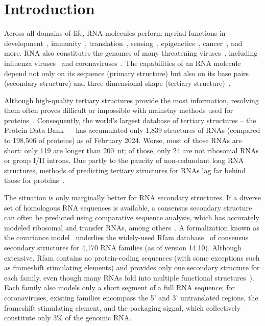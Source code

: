 \documentclass[main.tex]{subfiles}
\begin{document}
\section{Introduction}

Across all domains of life, RNA molecules perform myriad functions in development~\cite{Klattenhoff2013}, immunity~\cite{Wiedenheft2012}, translation~\cite{Noller2012}, sensing~\cite{Kortmann2012,Serganov2013}, epigenetics~\cite{Bhan2015}, cancer~\cite{Hajjari2015}, and more.
RNA also constitutes the genomes of many threatening viruses~\cite{Woolhouse2018}, including influenza viruses~\cite{Bouvier2008} and coronaviruses~\cite{Yang2015a}.
The capabilities of an RNA molecule depend not only on its sequence (primary structure) but also on its base pairs (secondary structure) and three-dimensional shape (tertiary structure)~\cite{Mortimer2014}.

Although high-quality tertiary structures provide the most information, resolving them often proves difficult or impossible with mainstay methods used for proteins~\cite{Kappel2020}.
Consequently, the world's largest database of tertiary structures -- the Protein Data Bank~\cite{Berman2000} -- has accumulated only 1,839 structures of RNAs (compared to 198,506 of proteins) as of February 2024.
Worse, most of those RNAs are short: only 119 are longer than 200~nt; of those, only 24 are not ribosomal RNAs or group I/II introns.
Due partly to the paucity of non-redundant long RNA structures, methods of predicting tertiary structures for RNAs lag far behind those for proteins~\cite{Schneider2023}.

The situation is only marginally better for RNA secondary structures.
If a diverse set of homologous RNA sequences is available, a consensus secondary structure can often be predicted using comparative sequence analysis, which has accurately modeled ribosomal and transfer RNAs, among others~\cite{Cannone2002}.
A formalization known as the covariance model~\cite{Eddy1994} underlies the widely-used Rfam database~\cite{Kalvari2020} of consensus secondary structures for 4,170 RNA families (as of version 14.10).
Although extensive, Rfam contains no protein-coding sequences (with some exceptions such as frameshift stimulating elements) and provides only one secondary structure for each family, even though many RNAs fold into multiple functional structures~\cite{Mustoe2014,Spitale2023}).
Each family also models only a short segment of a full RNA sequence; for coronaviruses, existing families encompass the 5' and 3' untranslated regions, the frameshift stimulating element, and the packaging signal, which collectively constitute only 3\% of the genomic RNA.
\end{document}
